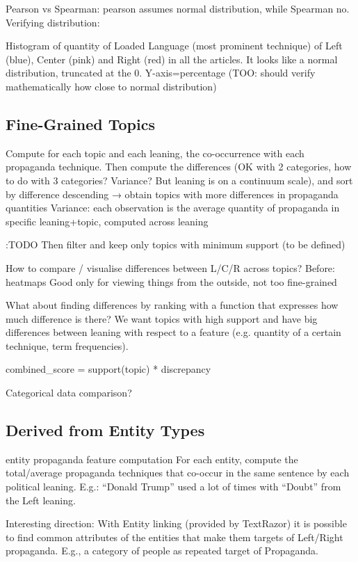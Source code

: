 Pearson vs Spearman: pearson assumes normal distribution, while Spearman no.
Verifying distribution:

Histogram of quantity of Loaded Language (most prominent technique) of Left (blue), Center (pink) and Right (red) in all the articles. It looks like a normal distribution, truncated at the 0. Y-axis=percentage (TOO: should verify mathematically how close to normal distribution)

\subsection{Fine-Grained Topics}

Compute for each topic and each leaning, the co-occurrence with each propaganda technique. Then compute the differences (OK with 2 categories, how to do with 3 categories? Variance? But leaning is on a continuum scale), and sort by difference descending → obtain topics with more differences in propaganda quantities
Variance: each observation is the average quantity of propaganda in specific leaning+topic, computed across leaning


:TODO
Then filter and keep only topics with minimum support (to be defined)

How to compare / visualise differences between L/C/R across topics?
Before: heatmaps
Good only for viewing things from the outside, not too fine-grained

What about finding differences by ranking with a function that expresses how much difference is there?
We want topics with high support and have big differences between leaning with respect to a feature (e.g. quantity of a certain technique, term frequencies).

combined\_score = support(topic) * discrepancy

Categorical data comparison?

\subsection{Derived from Entity Types}

entity propaganda feature computation
For each entity, compute the total/average propaganda techniques that co-occur in the same sentence by each political leaning. E.g.: “Donald Trump” used a lot of times with “Doubt” from the Left leaning.

Interesting direction:
With Entity linking (provided by TextRazor) it is possible to find common attributes of the entities that make them targets of Left/Right propaganda. E.g., a category of people as repeated target of Propaganda.

